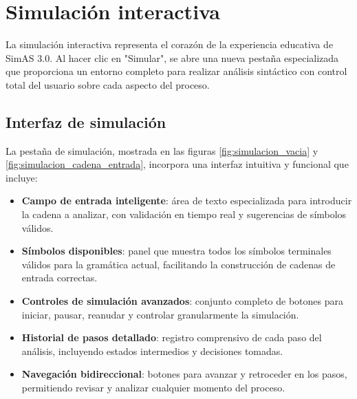 \section{Simulación interactiva}

La simulación interactiva representa el corazón de la experiencia educativa de SimAS 3.0. Al hacer clic en \string"Simular\string", se abre una nueva pestaña especializada que proporciona un entorno completo para realizar análisis sintáctico con control total del usuario sobre cada aspecto del proceso.

\subsection{Interfaz de simulación}

La pestaña de simulación, mostrada en las figuras \ref{fig:simulacion_vacia} y \ref{fig:simulacion_cadena_entrada}, incorpora una interfaz intuitiva y funcional que incluye:

\begin{itemize}
    \item \textbf{Campo de entrada inteligente}: área de texto especializada para introducir la cadena a analizar, con validación en tiempo real y sugerencias de símbolos válidos.
    \item \textbf{Símbolos disponibles}: panel que muestra todos los símbolos terminales válidos para la gramática actual, facilitando la construcción de cadenas de entrada correctas.
    \item \textbf{Controles de simulación avanzados}: conjunto completo de botones para iniciar, pausar, reanudar y controlar granularmente la simulación.
    \item \textbf{Historial de pasos detallado}: registro comprensivo de cada paso del análisis, incluyendo estados intermedios y decisiones tomadas.
    \item \textbf{Navegación bidireccional}: botones para avanzar y retroceder en los pasos, permitiendo revisar y analizar cualquier momento del proceso.
\end{itemize}

